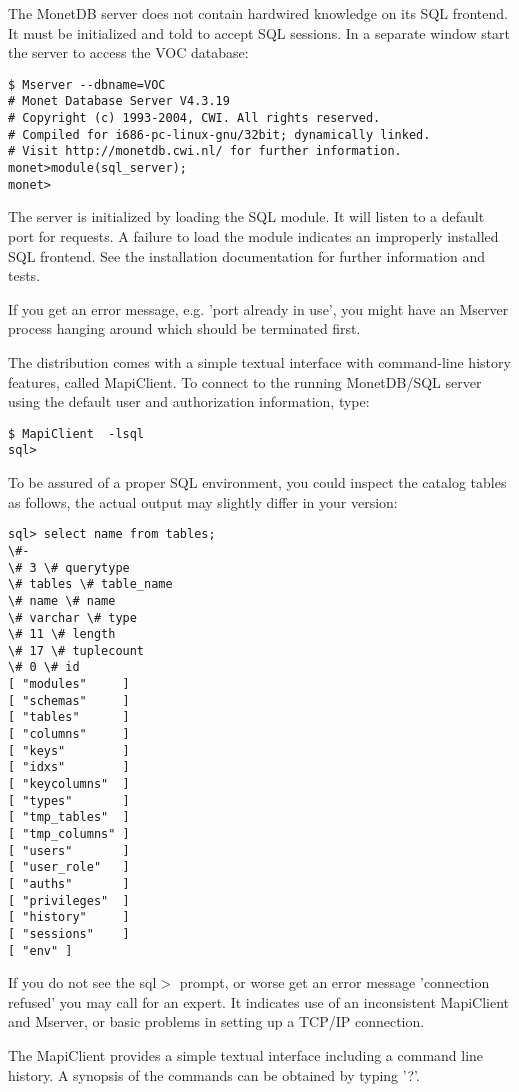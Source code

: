 \documentclass[10pt,twocolumn,fleqn]{article}
\begin{document}
The MonetDB server does not contain hardwired knowledge on its SQL frontend.
It must be initialized and told to accept SQL sessions. In a separate window
start the server to access the VOC database:

{\footnotesize
\begin{verbatim}
$ Mserver --dbname=VOC 
# Monet Database Server V4.3.19
# Copyright (c) 1993-2004, CWI. All rights reserved.
# Compiled for i686-pc-linux-gnu/32bit; dynamically linked.
# Visit http://monetdb.cwi.nl/ for further information.
monet>module(sql_server);
monet>
\end{verbatim}
}

The server is initialized by loading the SQL module. It will listen
to a default port for requests.
A failure to load the module indicates an improperly installed SQL
frontend. See the installation documentation for further information and
tests.

If you get an error message, e.g. 'port already in use', you might have 
an Mserver process hanging around which should be terminated first.

The distribution comes with a simple textual interface with
command-line history features, called MapiClient.
To connect to the running MonetDB/SQL server using the
default user and authorization information, type:

\begin{verbatim}
$ MapiClient  -lsql 
sql>
\end{verbatim}
To be assured of a proper SQL environment, you could inspect the catalog
tables as follows, the actual output may slightly differ in your version:
\begin{verbatim}
sql> select name from tables;
\#-
\# 3 \# querytype
\# tables \# table_name
\# name \# name
\# varchar \# type
\# 11 \# length
\# 17 \# tuplecount
\# 0 \# id
[ "modules"     ]
[ "schemas"     ]
[ "tables"      ]
[ "columns"     ]
[ "keys"        ]
[ "idxs"        ]
[ "keycolumns"  ]
[ "types"       ]
[ "tmp_tables"  ]
[ "tmp_columns" ]
[ "users"       ]
[ "user_role"   ]
[ "auths"       ]
[ "privileges"  ]
[ "history"     ]
[ "sessions"    ]
[ "env" ]
\end{verbatim}

If you do not see the sql$>$ prompt, or worse get an error
message 'connection refused' you may call for an expert.
It indicates use of an inconsistent MapiClient and Mserver,
or basic problems in setting up a TCP/IP connection.

The MapiClient provides a simple textual interface including
a command line history. A synopsis of the commands can be obtained
by typing '?'.
\end{document}
